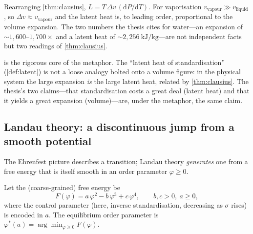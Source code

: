 \begin{corollary}
\label{cor:onesfact}
Rearranging \cref{thm:clausius}, $L=T\,\Delta v\,(\mathrm dP/\mathrm dT)$. For
vaporisation $v_{\text{vapour}}\gg v_{\text{liquid}}$, so $\Delta v\approx
v_{\text{vapour}}$ and the latent heat is, to leading order, proportional to the
volume expansion. The two numbers the thesis cites for water---an expansion of
${\sim}1{,}600$--$1{,}700\times$ and a latent heat of ${\sim}2{,}256\
\mathrm{kJ/kg}$---are not independent facts but two readings of
\cref{thm:clausius}.
\end{corollary}

 is the rigorous core of the metaphor. The ``latent heat of
standardisation'' (\cref{def:latent}) is not a loose analogy bolted onto a volume
figure: in the physical system the large expansion \emph{is} the large latent
heat, related by \cref{thm:clausius}. The thesis's two claims---that
standardisation costs a great deal (latent heat) and that it yields a great
expansion (volume)---are, under the metaphor, the same claim.

\subsection{Landau theory: a discontinuous jump from a smooth potential}
\label{sec:an-landau}

The Ehrenfest picture describes a transition; Landau theory \emph{generates} one
from a free energy that is itself smooth in an order parameter $\varphi\ge 0$.

\begin{construction}
\label{con:landau}
Let the (coarse-grained) free energy be
\[
F(\varphi)=a\,\varphi^{2}-b\,\varphi^{3}+c\,\varphi^{4},\qquad b,c>0,\ a\ge 0,
\]
where the control parameter (here, inverse standardisation, decreasing as
$\sigma$ rises) is encoded in $a$. The equilibrium order parameter is
$\varphi^{*}(a)=\arg\min_{\varphi\ge0}F(\varphi)$.
\end{construction}

